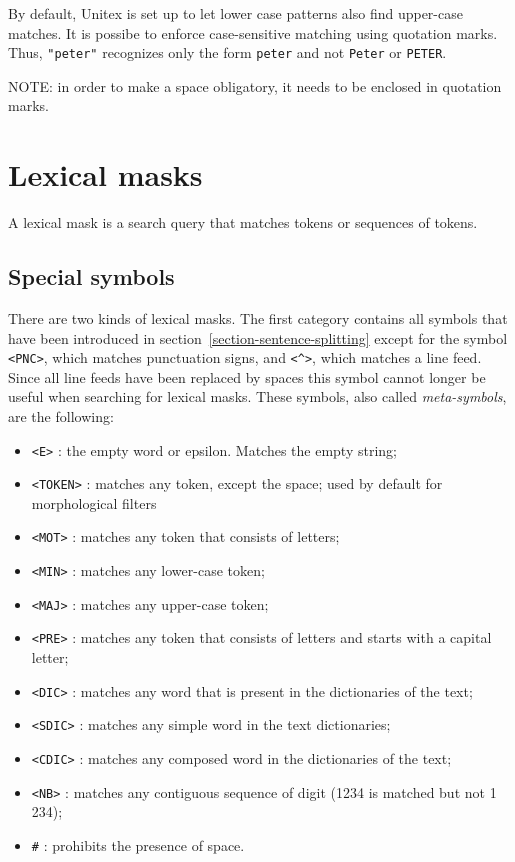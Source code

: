\noindent By default, Unitex is set up to let lower case patterns also find
upper-case matches. It is possibe to enforce case-sensitive matching using quotation marks. Thus,
\verb+"peter"+ recognizes only the form \verb+peter+ and not \verb+Peter+
or \verb+PETER+.

\bigskip
\noindent NOTE: in order to make a space obligatory, it needs to  be  enclosed 
in quotation marks.


\section{Lexical masks}
A lexical mask is a search query that matches tokens or sequences of tokens.

\subsection{Special symbols}
\label{section-special-symbols}

There are two kinds of lexical masks. The first category contains all symbols that have
been introduced in section~\ref{section-sentence-splitting} except for the
symbol \verb$<PNC>$, which matches punctuation signs, and \verb+<^>+, which matches a line feed.
Since all line feeds have been replaced by spaces this symbol cannot longer be
useful when searching for lexical masks. These symbols, also called \textit{meta-symbols}, are
the following:

\bigskip
{}
\index{\verb+#+}
\begin{itemize}
  \item \verb+<E>+ : the empty word or epsilon. Matches the empty string;
  \item \verb+<TOKEN>+ : matches any token, except the space; used by default
  for morphological filters
  \item \verb+<MOT>+ : matches any token that consists of letters;
  \item \verb+<MIN>+ : matches any lower-case token;
  \item \verb+<MAJ>+ : matches any upper-case token;
  \item \verb+<PRE>+ : matches any token that consists of letters and starts
  with a capital letter;
  \item \verb+<DIC>+ : matches any word that is present in the dictionaries of
  the text;
  \item \verb+<SDIC>+ : matches any simple word in the text
  dictionaries;
  \item \verb+<CDIC>+ : matches any composed word in the dictionaries of the
  text;
  \item \verb+<NB>+ : matches any contiguous sequence of digit (1234 is matched
  but not 1 234);
  \item \verb+#+ : prohibits the presence of space.
\end{itemize}

